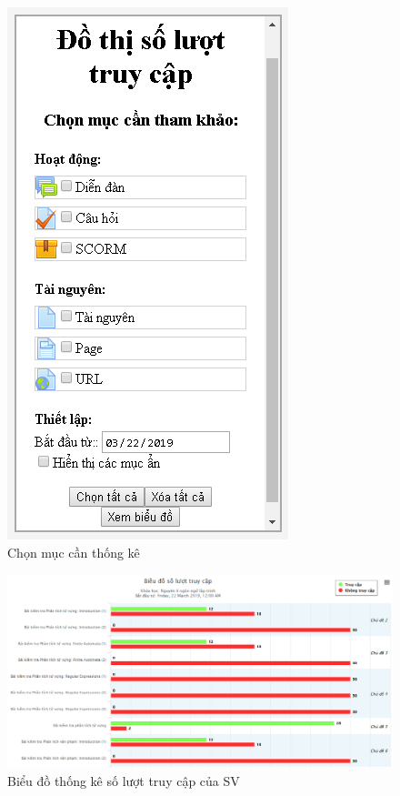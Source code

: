 \begin{center}
	\begin{figure}[htp]
		\begin{center}
			\includegraphics[width=0.6\linewidth]{img/26}
		\end{center}
		\caption{Chọn mục cần thống kê}
		\label{refhinh58}
	\end{figure}
\end{center}

\begin{center}
	\begin{figure}[htp]
		\begin{center}
			\includegraphics[width=1\linewidth]{img/27}
		\end{center}
		\caption{Biểu đồ thống kê số lượt truy cập của SV}
		\label{refhinh59}
	\end{figure}
\end{center}


